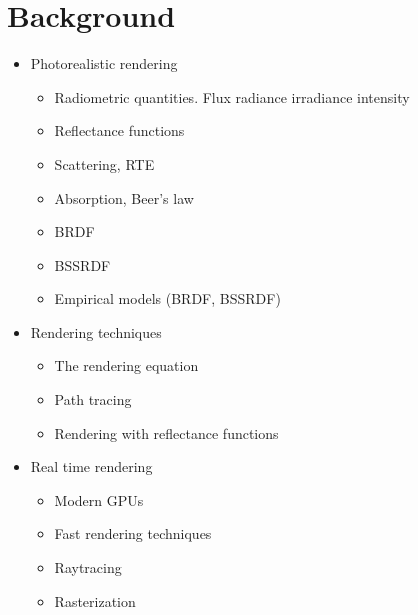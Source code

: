 \chapter{Background}

\begin{itemize}
\item Photorealistic rendering
\begin{itemize}
\item Radiometric quantities. Flux radiance irradiance intensity
\item Reflectance functions
\item Scattering, RTE
\item Absorption, Beer's law
\item BRDF
\item BSSRDF
\item Empirical models (BRDF, BSSRDF)
\end{itemize}
\item Rendering techniques
\begin{itemize}
\item The rendering equation
\item Path tracing
\item Rendering with reflectance functions
\end{itemize}
\item Real time rendering 
\begin{itemize}
\item Modern GPUs
\item Fast rendering techniques
\item Raytracing 
\item Rasterization
\end{itemize}
\end{itemize}